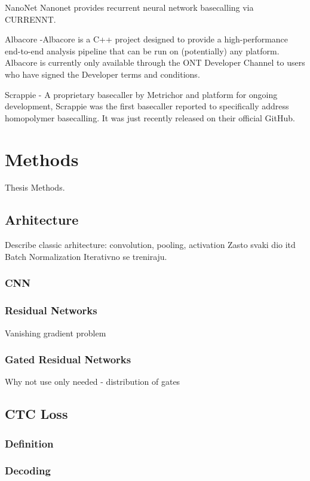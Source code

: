 \documentclass[times, utf8, diplomski, english]{fer}
\begin{document}
NanoNet Nanonet provides recurrent neural network basecalling via CURRENNT.

Albacore -Albacore is a C++ project designed to provide a high-performance end-to-end analysis pipeline that can be run on (potentially) any platform. Albacore is currently only available through the ONT Developer Channel to users who have signed the Developer terms and conditions. 

Scrappie - A proprietary basecaller by Metrichor and platform for ongoing
development, Scrappie was the first basecaller reported to specifically address
homopolymer basecalling. It was just recently released on their official GitHub.



\chapter{Methods}
Thesis Methods.
\section{Arhitecture}
Describe classic arhitecture: convolution, pooling, activation
Zasto svaki dio itd
Batch Normalization 
Iterativno se treniraju.
\subsection{CNN}
\subsection{Residual Networks}
Vanishing gradient problem
\subsection{Gated Residual Networks}
Why not use only needed - distribution of gates

\section{CTC Loss}
\subsection{Definition}
\subsection{Decoding}
\end{document}
